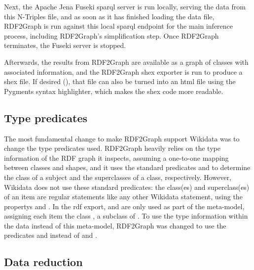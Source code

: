 Next, the Apache Jena Fuseki \gls{sparql} server is run locally,
serving the data from this \gls{N-Triples} file,
and as soon as it has finished loading the data file,
\gls{RDF2Graph} is run against this local \gls{sparql} endpoint for the main inference process,
including \gls{RDF2Graph}’s simplification step.
Once \gls{RDF2Graph} terminates, the Fuseki server is stopped.

Afterwards, the results from \gls{RDF2Graph} are available as a graph of classes with associated information,
and the \gls{RDF2Graph} \gls{shex} exporter is run to produce a \gls{shex} file.
If desired (),
that file can also be turned into an \gls{html} file using the Pygments syntax highlighter,
which makes the \gls{shex} code more readable.


\subsection{Type predicates}
\label{subsec:RDF2Graph+Wikidata:Wikidata:predicates}

The most fundamental change to make \gls{RDF2Graph} support \gls{Wikidata}
was %
to change the type predicates used.
\Gls{RDF2Graph} heavily relies on the type information of the RDF graph it inspects,
assuming a one-to-one mapping between classes and shapes,
and it uses the standard \glspl{predicate}  and 
to determine the class of a subject and the superclasses of a class, respectively.
However, \gls{Wikidata} does not use these standard \glspl{predicate}:
the class(es) and superclass(es) of an item
are regular \glspl{statement} like any other \gls{Wikidata} \gls{statement},
using the \glspl{property}  and .
In the \gls{rdf} export,  and  are only used
as part of the meta-model, %
assigning each item the class , a subclass of .
To use the type information within the data instead of this meta-model,
\gls{RDF2Graph} was changed to use the \glspl{predicate}  and 
instead of  and .

\subsection{Data reduction}
\label{subsec:RDF2Graph+Wikidata:Wikidata:reduction}

